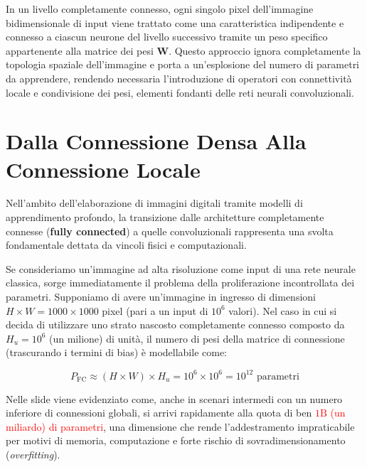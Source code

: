 ﻿\documentclass[11pt, a4paper]{article}
\begin{document}
In un livello completamente connesso, ogni singolo pixel dell'immagine bidimensionale di input viene trattato come una caratteristica indipendente e connesso a ciascun neurone del livello successivo tramite un peso specifico appartenente alla matrice dei pesi $\bm{W}$. Questo approccio ignora completamente la topologia spaziale dell'immagine e porta a un'esplosione del numero di parametri da apprendere, rendendo necessaria l'introduzione di operatori con connettività locale e condivisione dei pesi, elementi fondanti delle reti neurali convoluzionali.

\section{Dalla Connessione Densa Alla Connessione Locale}

Nell'ambito dell'elaborazione di immagini digitali tramite modelli di apprendimento profondo, la transizione dalle architetture completamente connesse (\textbf{fully connected}) a quelle convoluzionali rappresenta una svolta fondamentale dettata da vincoli fisici e computazionali.

Se consideriamo un'immagine ad alta risoluzione come input di una rete neurale classica, sorge immediatamente il problema della proliferazione incontrollata dei parametri. Supponiamo di avere un'immagine in ingresso di dimensioni $H \times W = 1000 \times 1000$ pixel (pari a un input di $10^6$ valori). Nel caso in cui si decida di utilizzare uno strato nascosto completamente connesso composto da $H_u = 10^6$ (un milione) di unità, il numero di pesi della matrice di connessione (trascurando i termini di bias) è modellabile come:

\[
P_{\text{FC}} \approx (H \times W) \times H_u = 10^6 \times 10^6 = 10^{12} \text{ parametri}
\]

Nelle slide viene evidenziato come, anche in scenari intermedi con un numero inferiore di connessioni globali, si arrivi rapidamente alla quota di ben \textcolor{red}{$1\text{B}$ (un miliardo) di parametri}, una dimensione che rende l'addestramento impraticabile per motivi di memoria, computazione e forte rischio di sovradimensionamento (\emph{overfitting}).

\end{document}

